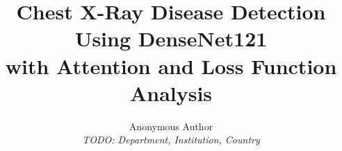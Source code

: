\documentclass[twocolumn,10pt]{article}
\title{%
  \textbf{Chest X-Ray Disease Detection Using DenseNet121\\[2pt]
  with Attention and Loss Function Analysis}
}
\author{%
  Anonymous Author \\
  \small\textit{TODO: Department, Institution, Country}
}
\date{}   %
\begin{document}
\maketitle
\thispagestyle{plain}

\begin{abstract}

\end{abstract}










\end{document}
